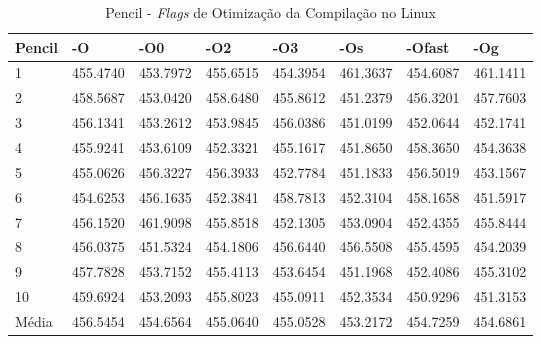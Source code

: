 \begin{apendicesenv}
\begin{table}[!ht]
\tiny
\centering
\caption{Pencil - \textit{Flags} de Otimização da Compilação no Linux}
\label{tab:otimizacao_compilacao:linux:pencil}
\begin{tabular}{llllllll}
\textbf{Pencil}            & \textbf{-O}  & \textbf{-O0}   & \textbf{-O2} & \textbf{-O3} & \textbf{-Os} & \textbf{-Ofast} & \textbf{-Og} \\ \toprule
1                          & 455.4740     &   453.7972     &  455.6515    &   454.3954   &   461.3637   &   454.6087      &   461.1411       \\ 
2                          & 458.5687     &   453.0420     &  458.6480    &   455.8612   &   451.2379   &   456.3201      &   457.7603       \\ 
3                          & 456.1341     &   453.2612     &  453.9845    &   456.0386   &   451.0199   &   452.0644      &   452.1741       \\ 
4                          & 455.9241     &   453.6109     &  452.3321    &   455.1617   &   451.8650   &   458.3650      &   454.3638       \\ 
5                          & 455.0626     &   456.3227     &  456.3933    &   452.7784   &   451.1833   &   456.5019      &   453.1567       \\ 
6                          & 454.6253     &   456.1635     &  452.3841    &   458.7813   &   452.3104   &   458.1658      &   451.5917       \\ 
7                          & 456.1520     &   461.9098     &  455.8518    &   452.1305   &   453.0904   &   452.4355      &   455.8444       \\ 
8                          & 456.0375     &   451.5324     &  454.1806    &   456.6440   &   456.5508   &   455.4595      &   454.2039       \\ 
9                          & 457.7828     &   453.7152     &  455.4113    &   453.6454   &   451.1968   &   452.4086      &   455.3102       \\ 
10                         & 459.6924     &   453.2093     &  455.8023    &   455.0911   &   452.3534   &   450.9296      &   451.3153       \\ \bottomrule
Média                      & 456.5454     &   454.6564     &  455.0640    &   455.0528   &   453.2172   &   454.7259      &   454.6861       \\ 
\end{tabular}
\end{table}



\end{apendicesenv}
